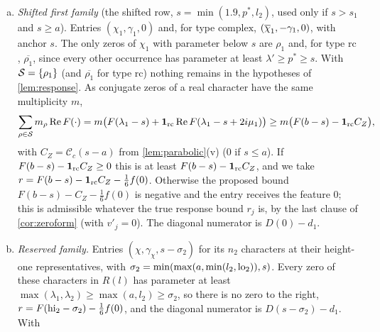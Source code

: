 \begin{enumerate}[(a)]
    Condition~2 and we take $R_p,R_q\ge0$; the multiplicities of the kept zeros can then only increase
    the sums. On the last piece $R_p=R_q=0$, which also covers a zero outside the disc (its term is
    then absent). Each same-character pair is a controlled pair with excess
    $(c^{\hi}-d_1)_+$, $c^{\hi}\ge\sup\Re G(-s_1+iy)$, so every diagonal numerator is $D(0)-d_1+(c^{\hi}-d_1)_+$;
    an entry of $\chi_1$ and an entry of $\bchi_1$ form a pair of distinct characters, with the nonprincipal
    quotient $\chi_1^2$, and carry no mutual excess. If $\rho'=\rho_1$ is a double zero, the two
    entries coincide and $r\ge m_{\rho_1}F(\lambda_1-s_1)-\frac16f(0)$ with $m_{\rho_1}\ge2$, which is at least
    both $r_{\gamma_1}$ and $r_{\gamma'}$ (here $y=0$ and $\lambda'=\lambda_1$).
  \item \emph{Shifted first family} (the shifted row, $s=\min(1.9,p^*,l_2)$, used only if $s>s_1$ and
    $s\ge a$). Entries $(\chi_1,\gamma_1,0)$ and, for type $\mathrm{complex}$, $(\overline{\chi}_1,-\gamma_1,0)$, with
    anchor $s$. The only zeros of $\chi_1$ with parameter below $s$ are $\rho_1$ and, for type
    $\mathrm{rc}$, $\overline{\rho_1}$, since every other occurrence has parameter at least $\lambda'\ge p^*\ge s$.
    With $\mathcal{S}=\{\rho_1\}$ (and $\overline{\rho_1}$ for type $\mathrm{rc}$) nothing remains in the hypotheses of
    \cref{lem:response}. As conjugate zeros of a real character have the same multiplicity $m$,
    \[
      \sum_{\rho\in\mathcal{S}}m_\rho\operatorname{Re} F(\cdot)=m\bigl(F(\lambda_1-s)+\mathbf{1}_{\mathrm{rc}}\operatorname{Re} F(\lambda_1-s+2i\mu_1)\bigr)
      \ge m\bigl(F(b-s)-\mathbf{1}_{\mathrm{rc}}C_Z\bigr),
    \]
    with $C_Z=\mathcal C_c(s-a)$ from \cref{lem:parabolic}(v) ($0$ if $s\le a$). If $F(b-s)-\mathbf{1}_{\mathrm{rc}}C_Z\ge0$
    this is at least $F(b-s)-\mathbf{1}_{\mathrm{rc}}C_Z$, and we take $r=F(b-s)-\mathbf{1}_{\mathrm{rc}}C_Z-\frac16f(0)$.
    Otherwise the proposed bound $F(b-s)-C_Z-\frac16f(0)$ is negative and the entry receives the feature
    $0$; this is admissible whatever the true response bound $r_j$ is, by the last clause of
    \cref{cor:zeroform} (with $v'_j=0$). The diagonal numerator is $D(0)-d_1$.
  \item \emph{Reserved family.} Entries $(\chi,\gamma_\chi,s-\sigma_2)$ for its $n_2$ characters at their
    height-one representatives, with $\sigma_2=\min(\max(a,\min(l_2,\mathrm{lo}_2)),s)$. Every zero of these
    characters in $R(l)$ has parameter at least $\max(\lambda_1,\lambda_2)\ge\max(a,l_2)\ge\sigma_2$, so there is no
    zero to the right, $r=F(\mathrm{hi}_2-\sigma_2)-\frac16f(0)$, and the diagonal numerator is $D(s-\sigma_2)-d_1$. With

\end{enumerate}

